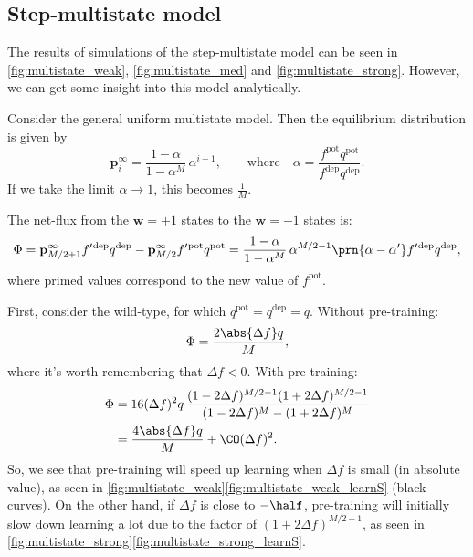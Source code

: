 \documentclass[12pt]{article}
\newcommand{\pr}{\mathbf{p}}
\newcommand{\eq}{\pr^\infty}
\newcommand{\w}{\mathbf{w}}
\newcommand{\pot}{^{\text{pot}}}
\newcommand{\dep}{^{\text{dep}}}
\begin{document}
\subsection{Step-multistate model}\label{sec:multistate}





The results of simulations of the step-multistate model can be seen in \autoref{fig:multistate_weak}, \autoref{fig:multistate_med} and \autoref{fig:multistate_strong}.
However, we can get some insight into this model analytically.



Consider the general uniform multistate model.
Then the equilibrium distribution is given by
%
\begin{equation}\label{eq:mutltieq}
  \eq_i = \frac{1-\alpha}{1-\alpha^M}\,\alpha^{i-1},
  \qquad \text{where} \quad
  \alpha=\frac{f\pot q\pot}{f\dep q\dep}.
\end{equation}
%
If we take the limit $\alpha\rightarrow1$, this becomes $\frac{1}{M}$.

The net-flux from the $\w=+1$ states to the $\w=-1$ states is:
%
\begin{equation}\label{eq:multiflux}
  \Phi = \eq_{M/2+1}f'{}\dep q\dep - \eq_{M/2}f'{}\pot q\pot = \frac{1-\alpha}{1-\alpha^M}\,\alpha^{M/2-1}\prn{\alpha-\alpha'}f'{}\dep q\dep,
\end{equation}
%
where primed values correspond to the new value of $f\pot$.

First, consider the wild-type, for which $q\pot=q\dep=q$.
Without pre-training:
%
\begin{equation}\label{eq:multiWTnopre}
  \Phi = \frac{2\abs{\Delta f}q}{M},
\end{equation}
%
where it's worth remembering that $\Delta f<0$.
With pre-training:
%
\begin{equation}\label{eq:multiWTpre}
\begin{aligned}
  \Phi &= 16(\Delta f)^2q \, \frac{(1-2\Delta f)^{M/2-1} (1+2\Delta f)^{M/2-1}}
          {(1-2\Delta f)^M - (1+2\Delta f)^M} \\
       &= \frac{4\abs{\Delta f}q}{M} + \CO(\Delta f)^2.
\end{aligned}
\end{equation}
%
So, we see that pre-training will speed up learning when $\Delta f$ is small (in absolute value), as seen in \autoref{fig:multistate_weak}\ref{fig:multistate_weak_learnS} (black curves).
On the other hand, if $\Delta f$ is close to $-\half$, pre-training will initially slow down learning a lot due to the factor of $(1+2\Delta f)^{M/2-1}$, as seen in \autoref{fig:multistate_strong}\ref{fig:multistate_strong_learnS}.
\end{document}
